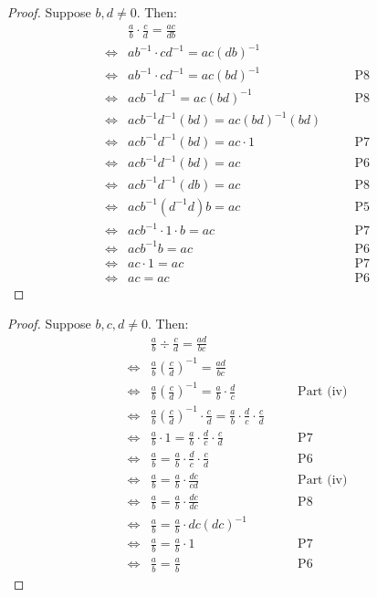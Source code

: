 \begin{proof}
    Suppose $b, d \not = 0$. Then:
    \begin{align*}
        &\frac{a}{b} \cdot \frac{c}{d} = \frac{ac}{db} &&\quad \text{} \\
            \iff & ab^{-1} \cdot cd^{-1} = ac(db)^{-1} &&\quad \text{} \\
            \iff & ab^{-1} \cdot cd^{-1} = ac(bd)^{-1} &&\quad \text{P8} \\
            \iff & acb^{-1}d^{-1} = ac(bd)^{-1} &&\quad \text{P8} \\
            \iff & acb^{-1}d^{-1}(bd) = ac(bd)^{-1}(bd) &&\quad \text{} \\
            \iff & acb^{-1}d^{-1}(bd) = ac \cdot 1 &&\quad \text{P7} \\
            \iff & acb^{-1}d^{-1}(bd) = ac &&\quad \text{P6} \\
            \iff & acb^{-1}d^{-1}(db) = ac &&\quad \text{P8} \\
            \iff & acb^{-1}(d^{-1}d)b = ac &&\quad \text{P5} \\
            \iff & acb^{-1} \cdot 1 \cdot b = ac &&\quad \text{P7} \\
            \iff & acb^{-1}b = ac &&\quad \text{P6} \\
            \iff & ac \cdot 1 = ac &&\quad \text{P7} \\
            \iff & ac = ac &&\quad \text{P6} 
    \end{align*}
\end{proof}

\begin{proof}
    Suppose $b, c, d \not = 0$. Then:
    \begin{align*}
        &\frac{a}{b} \div \frac{c}{d} = \frac{ad}{bc} &&\quad \text{} \\
        \iff&\frac{a}{b}\left(\frac{c}{d}\right)^{-1} = \frac{ad}{bc} &&\quad \text{} \\
        \iff&\frac{a}{b}\left(\frac{c}{d}\right)^{-1} = \frac{a}{b} \cdot \frac{d}{c} &&\quad \text{Part (iv)} \\
        \iff&\frac{a}{b}\left(\frac{c}{d}\right)^{-1} \cdot \frac{c}{d} = \frac{a}{b} \cdot \frac{d}{c} \cdot \frac{c}{d} &&\quad \text{} \\
        \iff&\frac{a}{b} \cdot 1 = \frac{a}{b} \cdot \frac{d}{c} \cdot \frac{c}{d} &&\quad \text{P7} \\
        \iff&\frac{a}{b} = \frac{a}{b} \cdot \frac{d}{c} \cdot \frac{c}{d} &&\quad \text{P6} \\
        \iff&\frac{a}{b} = \frac{a}{b} \cdot \frac{dc}{cd} &&\quad \text{Part (iv)} \\
        \iff&\frac{a}{b} = \frac{a}{b} \cdot \frac{dc}{dc} &&\quad \text{P8} \\
        \iff&\frac{a}{b} = \frac{a}{b} \cdot dc(dc)^{-1} &&\quad \text{} \\
        \iff&\frac{a}{b} = \frac{a}{b} \cdot 1 &&\quad \text{P7} \\
        \iff&\frac{a}{b} = \frac{a}{b} &&\quad \text{P6} 
    \end{align*}
\end{proof}

